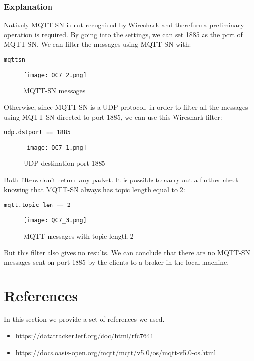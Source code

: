 \subsubsection{Explanation}
Natively MQTT-SN is not recognised by Wireshark and therefore a preliminary operation is required. By going into the settings, we can set 1885 as the port of MQTT-SN.
We can filter the messages using MQTT-SN with:
\begin{verbatim}
mqttsn
\end{verbatim}
\begin{figure}[H]
    \centering
    \texttt{[image: QC7\_2.png]}
    \caption{MQTT-SN messages}
\end{figure}
Otherwise, since MQTT-SN is a UDP protocol, in order to filter all the messages using MQTT-SN directed to port 1885, we can use this Wireshark filter:
\begin{verbatim}
udp.dstport == 1885
\end{verbatim}
\begin{figure}[H]
    \centering
    \texttt{[image: QC7\_1.png]}
    \caption{UDP destination port 1885}
\end{figure}

Both filters don't return any packet. It is possible to carry out a further check knowing that MQTT-SN always has topic length equal to 2:
\begin{verbatim}
mqtt.topic_len == 2
\end{verbatim}
\begin{figure}[H]
    \centering
    \texttt{[image: QC7\_3.png]}
    \caption{MQTT messages with topic length 2}
\end{figure}
But this filter also gives no results. We can conclude that there are no MQTT-SN messages sent on port 1885 by the clients to a broker in the local machine.

\section{References}
In this section we provide a set of references we used.
\begin{itemize}
	\item \url{https://datatracker.ietf.org/doc/html/rfc7641}
	\item \url{https://docs.oasis-open.org/mqtt/mqtt/v5.0/os/mqtt-v5.0-os.html}
\end{itemize}
























